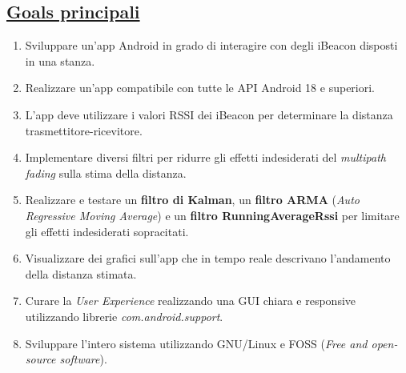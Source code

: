 \subsection{\underline{Goals principali}}
\begin{enumerate}
	\item Sviluppare un'app Android in grado di interagire con degli iBeacon disposti in una stanza.
	
	\item Realizzare un'app compatibile con tutte le API Android 18 e superiori.
	
	\item L'app deve utilizzare i valori RSSI dei iBeacon per determinare la distanza trasmettitore-ricevitore.
	
	\item Implementare diversi filtri per ridurre gli effetti indesiderati del \textit{multipath fading} sulla stima della distanza.
	
	\item Realizzare e testare un \textbf{filtro di Kalman}, un \textbf{filtro ARMA} (\textit{Auto Regressive Moving Average}) e un \textbf{filtro RunningAverageRssi} per limitare gli effetti indesiderati sopracitati.
	
	\item Visualizzare dei grafici sull'app che in tempo reale descrivano l'andamento della distanza stimata.
	
	\item Curare la \textit{User Experience} realizzando una GUI chiara e responsive utilizzando librerie \textit{com.android.support}.
	
	\item Sviluppare l'intero sistema utilizzando GNU/Linux e FOSS (\textit{Free and open-source software}).
\end{enumerate}

